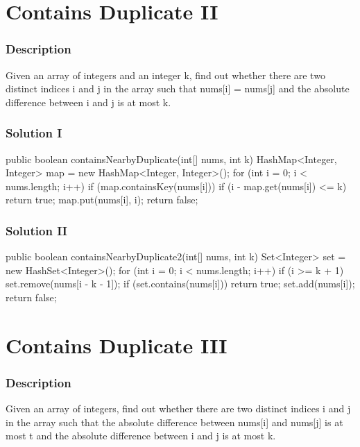\newpage

\section{Contains Duplicate II} %

\subsubsection{Description}
Given an array of integers and an integer k, find out whether there are two distinct indices i and j in the array such that nums[i] = nums[j] and the absolute difference between i and j is at most k.

\subsubsection{Solution I}

\begin{Code}
public boolean containsNearbyDuplicate(int[] nums, int k) {
    HashMap<Integer, Integer> map = new HashMap<Integer, Integer>();
    for (int i = 0; i < nums.length; i++) {
        if (map.containsKey(nums[i])) {
            if (i - map.get(nums[i]) <= k) {
                return true;
            }
        }
        map.put(nums[i], i);
    }
    return false;
}
\end{Code}

\subsubsection{Solution II}
\begin{Code}
public boolean containsNearbyDuplicate2(int[] nums, int k) {
    Set<Integer> set = new HashSet<Integer>();
    for (int i = 0; i < nums.length; i++) {
        if (i >= k + 1) {
            set.remove(nums[i - k - 1]);
        }
        if (set.contains(nums[i])) {
            return true;
        }
        set.add(nums[i]);
    }
    return false;
}
\end{Code}

\newpage

\section{Contains Duplicate III} %

\subsubsection{Description}
Given an array of integers, find out whether there are two distinct indices i and j in the array such that the absolute difference between nums[i] and nums[j] is at most t and the absolute difference between i and j is at most k.

